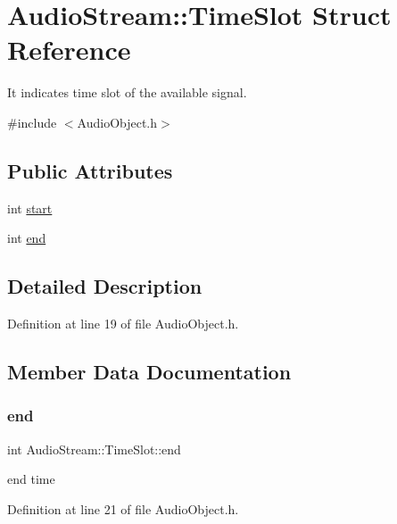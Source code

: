 \hypertarget{struct_audio_stream_1_1_time_slot}{}\section{Audio\+Stream\+:\+:Time\+Slot Struct Reference}
\label{struct_audio_stream_1_1_time_slot}


It indicates time slot of the available signal.  




{\ttfamily \#include $<$Audio\+Object.\+h$>$}

\subsection*{Public Attributes}
\begin{DoxyCompactItemize}
\item 
int \hyperlink{struct_audio_stream_1_1_time_slot_ae5191a76f4255eec3ea4fb6f7c3a5246}{start}
\item 
int \hyperlink{struct_audio_stream_1_1_time_slot_a8e20d0e50a37bade2849f0c09f1034cc}{end}
\end{DoxyCompactItemize}


\subsection{Detailed Description}


Definition at line 19 of file Audio\+Object.\+h.



\subsection{Member Data Documentation}
\mbox{\label{struct_audio_stream_1_1_time_slot_a8e20d0e50a37bade2849f0c09f1034cc}} 
\subsubsection{\texorpdfstring{end}{end}}
{\footnotesize\ttfamily int Audio\+Stream\+::\+Time\+Slot\+::end}

end time 

Definition at line 21 of file Audio\+Object.\+h.

